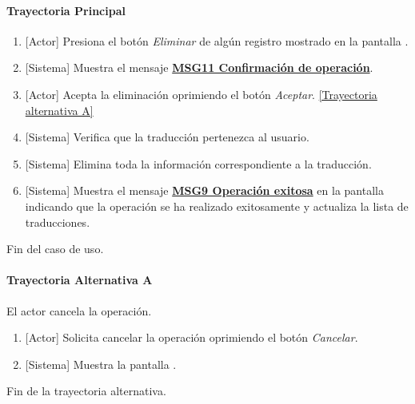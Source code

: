 \paragraph{Trayectoria Principal}
\label{W-PR-CU1.1.3}
	\begin{enumerate}
	    \item {[Actor]} Presiona el botón \textit{Eliminar} de algún registro mostrado en la pantalla \textbf{}.
	    
	    \item {[Sistema]} Muestra el mensaje \hyperref[MSG11]{\bf MSG11 Confirmación de operación}.
	    
	    \item {[Actor]} Acepta la eliminación oprimiendo el botón \textit{Aceptar}. \hyperref[W-PR-CU1.1.3:TA]{[Trayectoria alternativa A]}
	    
	    \item {[Sistema]} Verifica que la traducción pertenezca al usuario.
	    
	    \item {[Sistema]} Elimina toda la información correspondiente a la traducción.
	    
	    \item {[Sistema]} Muestra el mensaje \hyperref[MSG9]{\bf MSG9 Operación exitosa} en la pantalla \textbf{} indicando que la operación se ha realizado exitosamente y actualiza la lista de traducciones.
	\end{enumerate}
	Fin del caso de uso.
	
\paragraph{Trayectoria Alternativa A} \label{W-PR-CU1.1.3:TA}
	El actor cancela la operación.
	\begin{enumerate}[label=A\arabic*.]
		\item {[Actor]} Solicita cancelar la operación oprimiendo el botón \textit{Cancelar}.
		\item {[Sistema]} Muestra la pantalla \textbf{}.
	\end{enumerate}
	Fin de la trayectoria alternativa.
